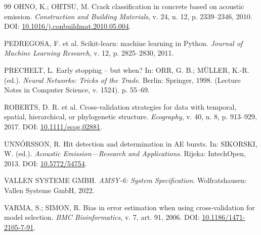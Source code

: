 \documentclass[12pt]{article}
\begin{document}
\begin{thebibliography}{99}
	OHNO, K.; OHTSU, M.
	\newblock Crack classification in concrete based on acoustic emission.
	\newblock \emph{Construction and Building Materials}, v. 24, n. 12, p. 2339--2346, 2010.
	\newblock DOI: \href{https://doi.org/10.1016/j.conbuildmat.2010.05.004}{10.1016/j.conbuildmat.2010.05.004}.

	PEDREGOSA, F. et al.
	\newblock Scikit-learn: machine learning in Python.
	\newblock \emph{Journal of Machine Learning Research}, v. 12, p. 2825--2830, 2011.

	PRECHELT, L.
	\newblock Early stopping -- but when?
	\newblock In: ORR, G. B.; MÜLLER, K.-R. (ed.). \emph{Neural Networks: Tricks of the Trade}.
	\newblock Berlin: Springer, 1998. (Lecture Notes in Computer Science, v. 1524). p. 55--69.

	ROBERTS, D. R. et al.
	\newblock Cross-validation strategies for data with temporal, spatial, hierarchical, or phylogenetic structure.
	\newblock \emph{Ecography}, v. 40, n. 8, p. 913--929, 2017.
	\newblock DOI: \href{https://doi.org/10.1111/ecog.02881}{10.1111/ecog.02881}.

	UNN{\TH}{\'O}RSSON, R.
	\newblock Hit detection and determination in AE bursts.
	\newblock In: SIKORSKI, W. (ed.). \emph{Acoustic Emission---Research and Applications}.
	\newblock Rijeka: IntechOpen, 2013.
	\newblock DOI: \href{https://doi.org/10.5772/54754}{10.5772/54754}.

	VALLEN SYSTEME GMBH.
	\newblock \emph{AMSY-6: System Specification}.
	\newblock Wolfratshausen: Vallen Systeme GmbH, 2022.

	VARMA, S.; SIMON, R.
	\newblock Bias in error estimation when using cross-validation for model selection.
	\newblock \emph{BMC Bioinformatics}, v. 7, art. 91, 2006.
	\newblock DOI: \href{https://doi.org/10.1186/1471-2105-7-91}{10.1186/1471-2105-7-91}.

\end{thebibliography}
\end{document}

